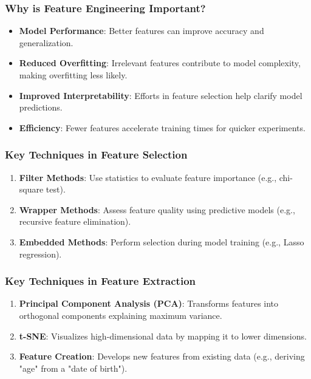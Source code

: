 \documentclass[aspectratio=169]{beamer}
\begin{document}
\begin{frame}
    \frametitle{Why is Feature Engineering Important?}
    \begin{itemize}
        \item \textbf{Model Performance}: Better features can improve accuracy and generalization.
        \item \textbf{Reduced Overfitting}: Irrelevant features contribute to model complexity, making overfitting less likely.
        \item \textbf{Improved Interpretability}: Efforts in feature selection help clarify model predictions.
        \item \textbf{Efficiency}: Fewer features accelerate training times for quicker experiments.
    \end{itemize}
\end{frame}

\begin{frame}
    \frametitle{Key Techniques in Feature Selection}
    \begin{enumerate}
        \item \textbf{Filter Methods}: Use statistics to evaluate feature importance (e.g., chi-square test).
        \item \textbf{Wrapper Methods}: Assess feature quality using predictive models (e.g., recursive feature elimination).
        \item \textbf{Embedded Methods}: Perform selection during model training (e.g., Lasso regression).
    \end{enumerate}
\end{frame}

\begin{frame}
    \frametitle{Key Techniques in Feature Extraction}
    \begin{enumerate}
        \item \textbf{Principal Component Analysis (PCA)}: Transforms features into orthogonal components explaining maximum variance.
        \item \textbf{t-SNE}: Visualizes high-dimensional data by mapping it to lower dimensions.
        \item \textbf{Feature Creation}: Develops new features from existing data (e.g., deriving "age" from a "date of birth").
    \end{enumerate}
\end{frame}
\end{document}
